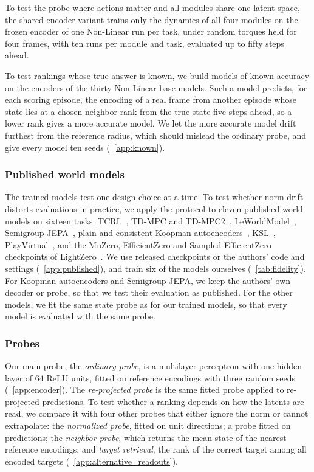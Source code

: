 To test the probe where actions matter and all modules share one latent space, the shared-encoder variant trains only the dynamics of all four modules on the frozen encoder of one Non-Linear run per task, under random torques held for four frames, with ten runs per module and task, evaluated up to fifty steps ahead.

To test rankings whose true answer is known, we build models of known accuracy on the encoders of the thirty Non-Linear base models. Such a model predicts, for each scoring episode, the encoding of a real frame from another episode whose state lies at a chosen neighbor rank from the true state five steps ahead, so a lower rank gives a more accurate model. We let the more accurate model drift furthest from the reference radius, which should mislead the ordinary probe, and give every model ten seeds (\supsec~\ref{app:known}).

\subsubsection{Published world models}
\label{sec:lewm}
The trained models test one design choice at a time. To test whether norm drift distorts evaluations in practice, we apply the protocol to eleven published world models on sixteen tasks: TCRL~\citep{zhao2023simplified}, TD-MPC and TD-MPC2~\citep{hansen2022temporal,Hansen2023}, LeWorldModel~\citep{maes2026leworldmodel}, Semigroup-JEPA~\citep{Liu2026SemigroupJEPA}, plain and consistent Koopman autoencoders~\citep{Azencot2020}, KSL~\citep{mcinroe2021learning}, PlayVirtual~\citep{yu2021playvirtual}, and the MuZero, EfficientZero and Sampled EfficientZero checkpoints of LightZero~\citep{Schrittwieser2020,ye2021mastering,hubert2021learning,niu2023lightzero}. We use released checkpoints or the authors' code and settings (\supsec~\ref{app:published}), and train six of the models ourselves (\suptab~\ref{tab:fidelity}). For Koopman autoencoders and Semigroup-JEPA, we keep the authors' own decoder or probe, so that we test their evaluation as published. For the other models, we fit the same state probe as for our trained models, so that every model is evaluated with the same probe.

\subsubsection{Probes}
\label{sec:instruments}
Our main probe, the \emph{ordinary probe}, is a multilayer perceptron with one hidden layer of $64$ ReLU units, fitted on reference encodings with three random seeds (\supsec~\ref{app:encoder}). The \emph{re-projected probe} is the same fitted probe applied to re-projected predictions. To test whether a ranking depends on how the latents are read, we compare it with four other probes that either ignore the norm or cannot extrapolate: the \emph{normalized probe}, fitted on unit directions; a probe fitted on predictions; the \emph{neighbor probe}, which returns the mean state of the nearest reference encodings; and \emph{target retrieval}, the rank of the correct target among all encoded targets (\supsec~\ref{app:alternative_readouts}).

